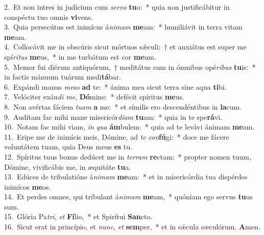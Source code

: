 {2.~}Et non intres in judícium cum \textit{ser}\textit{vo} \textbf{tu}o:~* quia non justificábitur in conspéctu tuo omnis \textbf{vi}vens.\\
{3.~}Quia persecútus est inimícus á\textit{ni}\textit{mam} \textbf{me}am:~* humiliávit in terra vitam \textbf{me}am.\\
{4.~}Collocávit me in obscúris sicut mórtuos sǽculi:~† et anxiátus est super me spí\textit{ri}\textit{tus} \textbf{me}us,~* in me turbátum est cor \textbf{me}um.\\
{5.~}Memor fui diérum antiquórum,~† meditátus sum in ómnibus opé\textit{ri}\textit{bus} \textbf{tu}is:~* in factis mánuum tuárum medi\textbf{tá}bar.\\
{6.~}Expándi manus \textit{me}\textit{as} \textbf{ad} te:~* ánima mea sicut terra sine aqua \textbf{ti}bi.\\
{7.~}Velóciter exáu\textit{di} \textit{me}, \textbf{Dó}mine:~* defécit spíritus \textbf{me}us.\\
{8.~}Non avértas fáciem \textit{tu}\textit{am} \textbf{a} me:~* et símilis ero descendéntibus in \textbf{la}cum.\\
{9.~}Audítam fac mihi mane misericór\textit{di}\textit{am} \textbf{tu}am:~* quia in te spe\textbf{rá}vi.\\
{10.~}Notam fac mihi viam, \textit{in} \textit{qua} \textbf{ám}bulem:~* quia ad te levávi ánimam \textbf{me}am.\\
{11.~}Eripe me de inimícis meis, Dómine, ad \textit{te} \textit{con}\textbf{fú}gi:~* doce me fácere voluntátem tuam, quia Deus meus \textbf{es} tu.\\
{12.~}Spíritus tuus bonus dedúcet me in \textit{ter}\textit{ram} \textbf{re}ctam:~* propter nomen tuum, Dómine, vivificábis me, in æquitáte \textbf{tu}a.\\
{13.~}Edúces de tribulatióne á\textit{ni}\textit{mam} \textbf{me}am:~* et in misericórdia tua dispérdes inimícos \textbf{me}os.\\
{14.~}Et perdes omnes, qui tríbulant á\textit{ni}\textit{mam} \textbf{me}am,~* quóniam ego servus \textbf{tu}us sum.\\
{15.~}Glória Pa\textit{tri}, \textit{et} \textbf{Fí}lio,~* et Spirítui \textbf{San}cto.\\
{16.~}Sicut erat in princípio, et \textit{nunc}, \textit{et} \textbf{sem}per,~* et in sǽcula sæculórum. \textbf{A}men.\\
